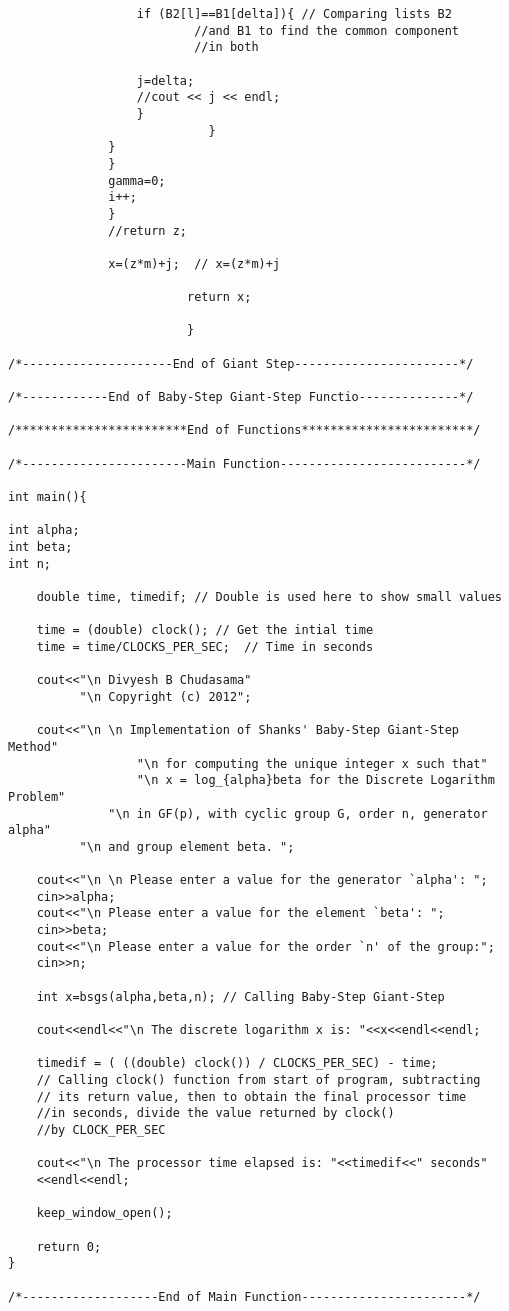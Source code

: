 \documentclass[iwp,first]{luthesis}
\begin{document}
\begin{verbatim}
                  if (B2[l]==B1[delta]){ // Comparing lists B2 
		                  //and B1 to find the common component 
		                  //in both

                  j=delta;
                  //cout << j << endl;
                  }
                            }
              }
              }
              gamma=0;
              i++;
              }
              //return z;
              
              x=(z*m)+j;  // x=(z*m)+j    
              
                         return x;
              
                         }                        

/*---------------------End of Giant Step-----------------------*/

/*------------End of Baby-Step Giant-Step Functio--------------*/

/************************End of Functions************************/

/*-----------------------Main Function--------------------------*/

int main(){
    
int alpha;
int beta;
int n;

    double time, timedif; // Double is used here to show small values

    time = (double) clock(); // Get the intial time
    time = time/CLOCKS_PER_SEC;  // Time in seconds 
    
    cout<<"\n Divyesh B Chudasama"
          "\n Copyright (c) 2012";
          
    cout<<"\n \n Implementation of Shanks' Baby-Step Giant-Step Method" 
		          "\n for computing the unique integer x such that" 
		          "\n x = log_{alpha}beta for the Discrete Logarithm Problem" 
	          "\n in GF(p), with cyclic group G, order n, generator alpha"
          "\n and group element beta. ";
             
    cout<<"\n \n Please enter a value for the generator `alpha': ";
    cin>>alpha;
    cout<<"\n Please enter a value for the element `beta': ";
    cin>>beta;
    cout<<"\n Please enter a value for the order `n' of the group:";
    cin>>n;
    
    int x=bsgs(alpha,beta,n); // Calling Baby-Step Giant-Step
    
    cout<<endl<<"\n The discrete logarithm x is: "<<x<<endl<<endl;
    
    timedif = ( ((double) clock()) / CLOCKS_PER_SEC) - time; 
    // Calling clock() function from start of program, subtracting 
    // its return value, then to obtain the final processor time 
    //in seconds, divide the value returned by clock() 
    //by CLOCK_PER_SEC
    
    cout<<"\n The processor time elapsed is: "<<timedif<<" seconds"
    <<endl<<endl;
    
    keep_window_open();
    
    return 0;
}       
    
/*-------------------End of Main Function-----------------------*/    

\end{verbatim}
\end{document}
